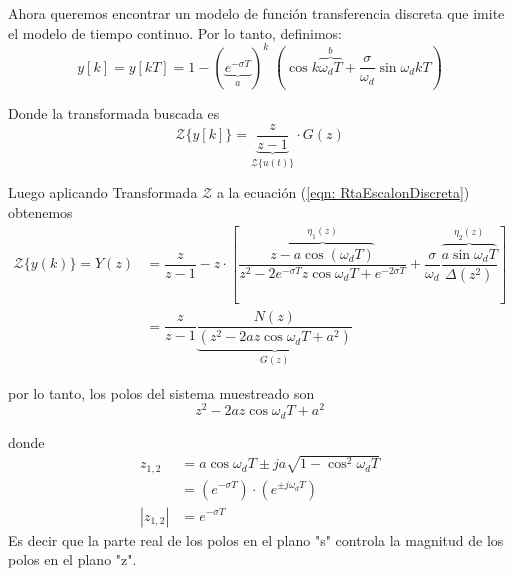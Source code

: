 Ahora queremos encontrar un modelo de función transferencia discreta que imite
el modelo de tiempo continuo. Por lo tanto, definimos:
\begin{equation}
    \label{eqn: RtaEscalonDiscreta}
    y[k] = y[kT] = 1 - (\underbrace{e^{-\sigma T}}_{a})^k \; (\cos{k\overbrace{\omega_d T}^{b} + \dfrac{\sigma}{\omega_d}\sin{\omega_d kT}})
\end{equation}

\begin{center}
\end{center}

Donde la transformada buscada es 
\begin{equation*}
    \mathcal{Z} \{y[k]\} = \underbrace{\dfrac{z}{z-1}}_{\text{$\mathcal{Z}\{ u(t)\}$}} \cdot G(z)
\end{equation*}

Luego aplicando Transformada $\mathcal{Z}$ a la ecuación (\ref*{eqn: RtaEscalonDiscreta}) obtenemos
\begin{equation}
    \begin{split}
        \mathcal{Z} \{y(k)\} = Y(z) &= \dfrac{z}{z-1} - z\cdot [\dfrac{\overbrace{z-a\cos(\omega_d T)}^{\text{$\eta_1(z)$}} }{z^2-2e^{-\sigma T}z \cos{\omega_d T}+e^{-2\sigma T}} + \dfrac{\sigma}{\omega_d}\dfrac{\overbrace{a\sin{\omega_d T}}^{\eta_2(z)}}{\Delta(z^2)}] \\
        &= \dfrac{z}{z-1} \underbrace{\dfrac{N(z)}{(z^2-2az\cos{\omega_d T}+a^2 )}}_{\text{$G(z)$}}
    \end{split}
\end{equation}

por lo tanto, los polos del sistema muestreado son
\begin{equation*}
    z^2 - 2az \cos{\omega_d T} + a^2
\end{equation*}

donde
\begin{equation}
    \begin{split}
        z_{1,2} &= a \cos{\omega_d T} \pm ja\sqrt{1-\cos^2{\omega_d T}} \\
        &= (e^{-\sigma T})\cdot (e^{\pm j\omega_d T})\\[10pt]
        |z_{1,2}| &= e^{-\sigma T}
    \end{split}  
\end{equation}
Es decir que la parte real de los polos en el plano "s" controla la magnitud
de los polos en el plano "z".

